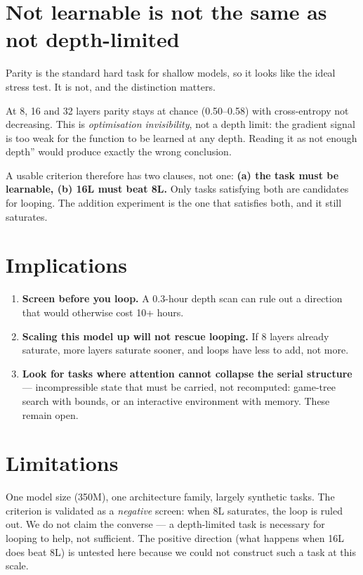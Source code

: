 \documentclass[10pt,twocolumn,letterpaper]{article}
\begin{document}
\section{Not learnable is not the same as not depth-limited}
\label{sec:learnability}

Parity is the standard hard task for shallow models, so it looks like the
ideal stress test. It is not, and the distinction matters.

At 8, 16 and 32 layers parity stays at chance (0.50--0.58) with
cross-entropy not decreasing. This is \emph{optimisation invisibility}, not a
depth limit: the gradient signal is too weak for the function to be learned
at any depth. Reading it as not enough depth'' would produce exactly the
wrong conclusion.

A usable criterion therefore has two clauses, not one:
\textbf{(a) the task must be learnable, (b) 16L must beat 8L.} Only tasks
satisfying both are candidates for looping. The addition experiment is the
one that satisfies both, and it still saturates.

\section{Implications}

\begin{enumerate}[leftmargin=1.2em,itemsep=2pt,topsep=2pt]
\item \textbf{Screen before you loop.} A 0.3-hour depth scan can rule out a
      direction that would otherwise cost 10+ hours.
\item \textbf{Scaling this model up will not rescue looping.} If 8 layers
      already saturate, more layers saturate sooner, and loops have less to
      add, not more.
\item \textbf{Look for tasks where attention cannot collapse the serial
      structure} --- incompressible state that must be carried, not
      recomputed: game-tree search with bounds, or an interactive
      environment with memory. These remain open.
\end{enumerate}

\section{Limitations}

One model size (350M), one architecture family, largely synthetic tasks.
The criterion is validated as a \emph{negative} screen: when 8L saturates, the
loop is ruled out. We do not claim the converse --- a depth-limited task is
necessary for looping to help, not sufficient. The positive direction (what
happens when 16L does beat 8L) is untested here because we could not
construct such a task at this scale.
\end{document}
